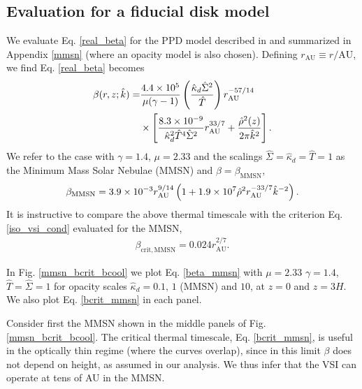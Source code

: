 {\subsection{Evaluation for a fiducial disk model}
We evaluate Eq. \ref{real_beta} for the PPD model
described in \cite{chiang10} and summarized in Appendix \ref{mmsn}
(where an opacity model is also chosen). Defining $r_\mathrm{AU}\equiv 
r/\mathrm{AU}$, we find Eq. \ref{real_beta} becomes
\begin{align}\label{beta_mmsn}
  \beta(r, z; \hat{k}) =
  &\frac{4.4\times10^5}{\mu(\gamma-1)}\left(\frac{\hat{\kappa}_d\hat{\Sigma}^2}{\hat{T}}\right)r_\mathrm{AU}^{-57/14}\notag\\ 
&\times\left[\frac{8.3\times10^{-9}}{\hat{\kappa}_d^2\hat{T}^4\hat{\Sigma}^2}r_\mathrm{AU}^{33/7}+\frac{\hat{\rho}^2(z)}{2\pi\hat{k}^2}\right].         
\end{align} 
We refer to the case with $\gamma=1.4$, $\mu=2.33$ and the scalings
$\hat{\Sigma}=\hat{\kappa}_d=\hat{T}=1$ as the Minimum Mass Solar
Nebulae (MMSN) and $\beta=\beta_\mathrm{MMSN}$, 
\begin{align}\label{beta_mmsn_simp}
  \beta_\mathrm{MMSN} = 3.9\times10^{-3} r_\mathrm{AU}^{9/14}\left( 1 +
    1.9\times10^7\hat{\rho}^2r_\mathrm{AU}^{-33/7}\hat{k}^{-2}\right). 
\end{align}
It is instructive to compare the above thermal timescale 
with the criterion Eq. \ref{iso_vsi_cond} evaluated for the MMSN,     
\begin{align}\label{bcrit_mmsn}
  \beta_\mathrm{crit,MMSN} = 0.024r_\mathrm{AU}^{2/7}. 
\end{align}

In Fig. \ref{mmsn_bcrit_bcool} we plot Eq. \ref{beta_mmsn}  with $\mu
=2.33$ $\gamma=1.4$, $\hat{T}=\hat{\Sigma}=1$ for opacity scales
$\hat{\kappa}_d=0.1, \,1 $ (MMSN) and $10$, at $z=0$ and $z=3H$. We
also plot Eq. \ref{bcrit_mmsn} in each panel.   

Consider first the MMSN shown in the middle panels of 
Fig. \ref{mmsn_bcrit_bcool}. The critical thermal timescale,
Eq. \ref{bcrit_mmsn}, is useful in the optically thin regime (where the
curves overlap), since in this limit $\beta$ does not depend on
height, as assumed in our analysis. We thus infer that the VSI can
operate at tens of AU in the MMSN.  

}

